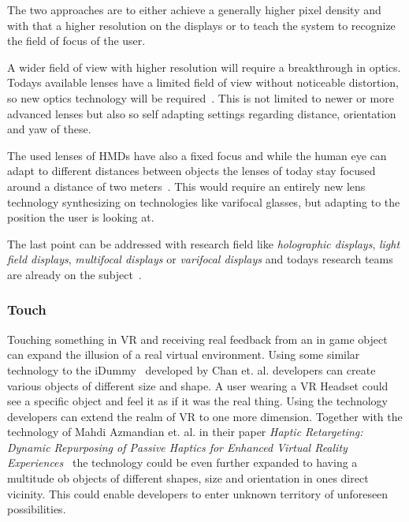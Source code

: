 The two approaches are to either achieve a generally higher pixel density and with that a higher resolution on the displays or to teach the system to recognize the field of focus of the user.

A wider field of view with higher resolution will require a breakthrough in optics. Todays available lenses have a limited field of view without noticeable distortion, so new optics technology will be required~\cite{online:oculusKeynote}. This is not limited to newer or more advanced lenses but also so self adapting settings regarding distance, orientation and yaw of these. 

The used lenses of HMDs have also a fixed focus and while the human eye can adapt to different distances between objects the lenses of today stay focused around a distance of two meters~\cite{online:oculusKeynote}. This would require an entirely new lens technology synthesizing on technologies like varifocal glasses, but adapting to the position the user is looking at.

The last point can be addressed with research field like \textit{holographic displays}, \textit{light field displays}, \textit{multifocal displays} or \textit{varifocal displays} and todays research teams are already on the subject~\cite{online:oculusKeynote}.

\subsubsection{Touch}

Touching something in VR and receiving real feedback from an in game object can expand the illusion of a real virtual environment. \newline
Using some similar technology to the iDummy~\cite{online:idummy} developed by Chan et. al. developers can create various objects of different size and shape. A user wearing a VR Headset could see a specific object and feel it as if it was the real thing. Using the technology developers can extend the realm of VR to one more dimension. Together with the technology of Mahdi Azmandian et. al. in their paper \textit{Haptic Retargeting: Dynamic Repurposing of	Passive Haptics for Enhanced Virtual Reality Experiences}~\cite{Azmandian:2016:HRD:2858036.2858226} the technology could be even further expanded to having a multitude ob objects of different shapes, size and orientation in ones direct vicinity. This could enable developers to enter unknown territory of unforeseen possibilities. 

